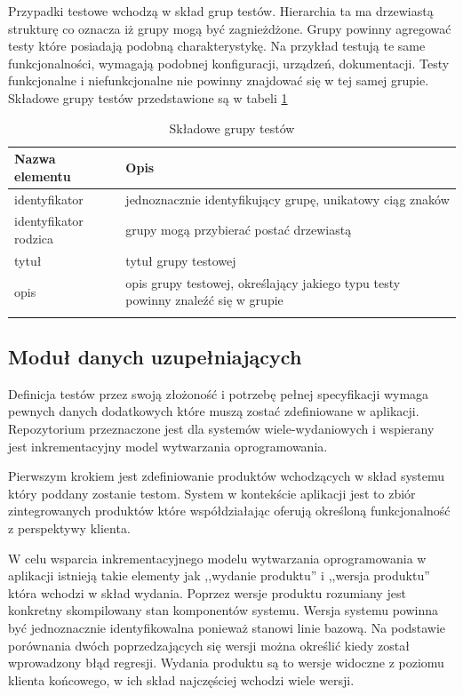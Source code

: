 Przypadki testowe wchodzą w skład grup testów. Hierarchia ta ma drzewiastą strukturę co oznacza iż grupy mogą być zagnieżdżone. Grupy powinny agregować testy które posiadają podobną charakterystykę. Na przykład testują te same funkcjonalności, wymagają podobnej konfiguracji, urządzeń, dokumentacji. Testy funkcjonalne i niefunkcjonalne nie powinny znajdować się w tej samej grupie. Składowe grupy testów przedstawione są w tabeli \ref{tab:grupaTestow}

\begin{longtable}{| p{6cm}  | p{10cm} |}
 \hline \hline
\textbf{Nazwa elementu} & \textbf{Opis}  \\ \hline
  identyfikator & jednoznacznie identyfikujący grupę, unikatowy ciąg znaków \\ \hline
  identyfikator rodzica & grupy mogą przybierać postać drzewiastą \\ \hline
  tytuł & tytuł grupy testowej \\ \hline
  opis & opis grupy testowej, określający jakiego typu testy powinny znaleźć się w grupie \\ \hline
 \caption{ Składowe grupy testów}
 \label{tab:grupaTestow}
\end{longtable}


\subsection{Moduł danych uzupełniających}

Definicja testów przez swoją złożoność i potrzebę pełnej specyfikacji wymaga pewnych danych dodatkowych które muszą zostać zdefiniowane w aplikacji. Repozytorium przeznaczone jest dla systemów wiele-wydaniowych i wspierany jest inkrementacyjny model wytwarzania oprogramowania.

Pierwszym krokiem jest zdefiniowanie produktów wchodzących w skład systemu który poddany zostanie testom. System w kontekście aplikacji jest to zbiór zintegrowanych produktów które współdziałając oferują określoną funkcjonalność z perspektywy klienta.

W celu wsparcia inkrementacyjnego modelu wytwarzania oprogramowania w aplikacji istnieją takie elementy jak ,,wydanie produktu'' i ,,wersja produktu'' która wchodzi w skład wydania. Poprzez wersje produktu rozumiany jest konkretny skompilowany stan komponentów systemu. Wersja systemu powinna być jednoznacznie identyfikowalna ponieważ stanowi linie bazową. Na podstawie porównania dwóch poprzedzających się wersji można określić kiedy został wprowadzony błąd regresji. Wydania produktu są to wersje widoczne z poziomu klienta końcowego, w ich skład najczęściej wchodzi wiele wersji.


